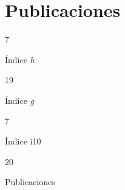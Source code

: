 \documentclass[11pt,a4paper,]{awesome-cv}
\begin{document}
\hypertarget{publicaciones}{%
\section{Publicaciones}\label{publicaciones}}

\begin{tcolorbox}[enhanced,
        on line, 
        boxsep=4pt, left=0pt,right=0pt,top=0pt,bottom=0pt,
        colframe=white,colback=violet,
        hyperurl={https://scholar.google.com/citations?user=XgNEpfgAAAAJ}]
  
\color{white}
  \begin{minipage}[c]{0.245\linewidth}
    \begin{center} 
      \begin{huge} 7 \end{huge}
     \begin{small} Índice \textit{h} \end{small} 
    \end{center} 
  \end{minipage} 
  \begin{minipage}[c]{0.245\linewidth}
    \begin{center} 
      \begin{huge} 19 \end{huge}
      \begin{small} Índice \textit{g} \end{small} 
    \end{center}
  \end{minipage} 
  \begin{minipage}[c]{0.245\linewidth}
    \begin{center} 
      \begin{huge} 7 \end{huge}
      \begin{small} Índice i10 \end{small} 
    \end{center}
  \end{minipage} 
  \begin{minipage}[c]{0.245\linewidth}
    \begin{center}  
      \begin{huge} 20 \end{huge}
      \begin{small} Publicaciones \end{small} 
    \end{center}
  \end{minipage} 
  

\end{tcolorbox}
\end{document}
